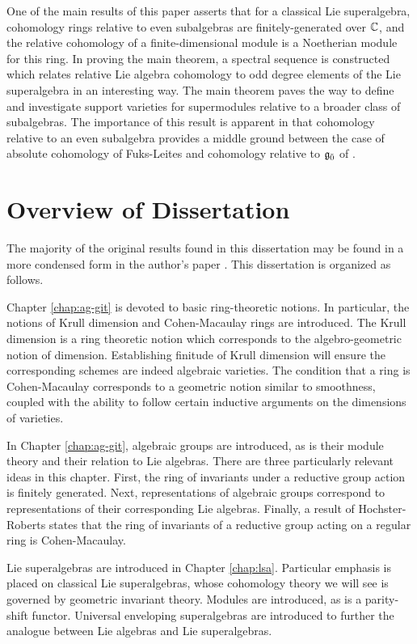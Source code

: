 One of the main results of this paper asserts that for a classical Lie superalgebra, cohomology rings relative to even subalgebras are finitely-generated over $\mathbb{C}$, and the relative cohomology of a finite-dimensional module is a Noetherian module for this ring. In proving the main theorem, a spectral sequence is constructed  which relates relative Lie algebra cohomology to odd degree elements of the Lie superalgebra in an interesting way. The main theorem paves the way to define and investigate support varieties for supermodules relative to a broader class of subalgebras. The importance of this result is apparent in that cohomology relative to an even subalgebra provides a middle ground between the case of absolute cohomology of Fuks-Leites and cohomology relative to ${\mathfrak{g}}_{\bar{0}}$ of \cite{BKN-1}.

\section{Overview of Dissertation}
\label{sec:overview}

The majority of the original results found in this dissertation may be found in a more condensed form in the author's paper \cite{1711.02112}. This dissertation is organized as follows.

Chapter \ref{chap:ag-git} is devoted to basic ring-theoretic notions. In particular, the notions of Krull dimension and Cohen-Macaulay rings are introduced. The Krull dimension is a ring theoretic notion which corresponds to the algebro-geometric notion of dimension. Establishing finitude of Krull dimension will ensure the corresponding schemes are indeed algebraic varieties. The condition that a ring is Cohen-Macaulay corresponds to a geometric notion similar to smoothness, coupled with the ability to follow certain inductive arguments on the dimensions of varieties.

In Chapter \ref{chap:ag-git}, algebraic groups are introduced, as is their module theory and their relation to Lie algebras. There are three particularly relevant ideas in this chapter. First, the ring of invariants under a reductive group action is finitely generated. Next, representations of algebraic groups correspond to representations of their corresponding Lie algebras. Finally, a result of Hochster-Roberts \cite{MR0347810} states that the ring of invariants of a reductive group acting on a regular ring is Cohen-Macaulay.

Lie superalgebras are introduced in Chapter \ref{chap:lsa}. Particular emphasis is placed on classical Lie superalgebras, whose cohomology theory we will see is governed by geometric invariant theory. Modules are introduced, as is a parity-shift functor. Universal enveloping superalgebras are introduced to further the analogue between Lie algebras and Lie superalgebras.

